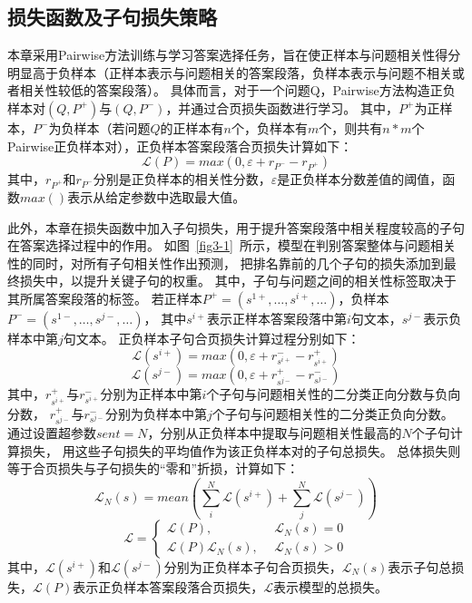 \subsection{损失函数及子句损失策略}

本章采用Pairwise方法训练与学习答案选择任务，旨在使正样本与问题相关性得分明显高于负样本（正样本表示与问题相关的答案段落，负样本表示与问题不相关或者相关性较低的答案段落）。
具体而言，对于一个问题Q，Pairwise方法构造正负样本对$(Q,P^+)$与$(Q,P^-)$，并通过合页损失函数进行学习。
其中，$P^+$为正样本，$P^-$为负样本（若问题$Q$的正样本有$n$个，负样本有$m$个，则共有$n\ast m$个Pairwise正负样本对），正负样本答案段落合页损失计算如下：
\begin{equation}
    \mathcal{L}(P)=max(0,\varepsilon+r_{P^-}-r_{P^+})
\end{equation}
其中，$r_{P^+}$和$r_{P^-}$分别是正负样本的相关性分数，$\varepsilon$是正负样本分数差值的阈值，函数$max()$表示从给定参数中选取最大值。

此外，本章在损失函数中加入子句损失，用于提升答案段落中相关程度较高的子句在答案选择过程中的作用。
如图~\ref{fig3-1}~所示，模型在判别答案整体与问题相关性的同时，对所有子句相关性作出预测，
把排名靠前的几个子句的损失添加到最终损失中，以提升关键子句的权重。
其中，子句与问题之间的相关性标签取决于其所属答案段落的标签。
若正样本$P^+=(s^{1+},\ldots,s^{i+},\ldots)$，负样本$P^-=(s^{1-},\ldots,s^{j-},\ldots)$，
其中$s^{i+}$表示正样本答案段落中第$i$句文本，$s^{j-}$表示负样本中第$j$句文本。
正负样本子句合页损失计算过程分别如下：
\begin{equation}
    \mathcal{L}(s^{i+})=max(0,\varepsilon+r_{s^{i+}}^--r_{s^{i+}}^+)
\end{equation}
\begin{equation}
    \mathcal{L}(s^{j-})=max(0,\varepsilon+r_{s^{j-}}^+-r_{s^{j-}}^-)
\end{equation}
其中，$r_{s^{i+}}^+$与$r_{s^{i+}}^-$分别为正样本中第$i$个子句与问题相关性的二分类正向分数与负向分数，
$r_{s^{j-}}^+$与$r_{s^{j-}}^-$分别为负样本中第$j$个子句与问题相关性的二分类正负向分数。
通过设置超参数$sent=N$，分别从正负样本中提取与问题相关性最高的$N$个子句计算损失，
用这些子句损失的平均值作为该正负样本对的子句总损失。
总体损失则等于合页损失与子句损失的“零和”折损，计算如下：
\begin{equation}
    \mathcal{L}_N(s)=mean(\sum_{i}^{N}\mathcal{L}(s^{i+})+\sum_{j}^{N}\mathcal{L}(s^{j-}))
\end{equation}
\begin{equation}
    \mathcal{L}=
    \begin{cases}
        \mathcal{L}(P), \ \ &\mathcal{L}_N(s)=0\\
        \mathcal{L}(P)\mathcal{L}_N(s),\ \ &\mathcal{L}_N(s)>0
    \end{cases}
\end{equation}
其中，$\mathcal{L}(s^{i+})$和$\mathcal{L}(s^{j-})$分别为正负样本子句合页损失，$\mathcal{L}_N(s)$表示子句总损失，$\mathcal{L}(P)$表示正负样本答案段落合页损失，$\mathcal{L}$表示模型的总损失。

